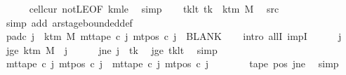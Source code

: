 \begin{isabellebody}
\ \ \ \ \isamarkupfalse%
\ cell{\isacharunderscore}{\kern0pt}cur\ notLE{\isacharbrackleft}{\kern0pt}OF\ km{}le{\isacharbrackright}{\kern0pt}\ \isamarkupfalse%
\ simp\isanewline
\ \ \isamarkupfalse%
\ tk{\isacharunderscore}{\kern0pt}lt{\isacharcolon}{\kern0pt}\ {\isachardoublequoteopen}tk\ {\isacharless}{\kern0pt}\ k{\isacharunderscore}{\kern0pt}tm\ M{\isachardoublequoteclose}\ \isamarkupfalse%
\ src{}\ \isamarkupfalse%
\ {\isacharparenleft}{\kern0pt}simp\ add{\isacharcolon}{\kern0pt}\ ar{\isacharunderscore}{\kern0pt}stage{\isacharunderscore}{\kern0pt}bounded{\isacharunderscore}{\kern0pt}def{\isacharparenright}{\kern0pt}\isanewline
\ \ \isamarkupfalse%
\ pad{\isacharunderscore}{\kern0pt}c{}{\isacharcolon}{\kern0pt}\ {\isachardoublequoteopen}{\isasymforall}j\ {\isasymge}\ k{\isacharunderscore}{\kern0pt}tm\ M{\isachardot}{\kern0pt}\ mt{\isacharunderscore}{\kern0pt}tape\ c{}\ j\ {\isacharparenleft}{\kern0pt}mt{\isacharunderscore}{\kern0pt}pos\ c{}\ j{\isacharparenright}{\kern0pt}\ {\isacharequal}{\kern0pt}\ BLANK{}{\isachardoublequoteclose}\isanewline
\ \ \isamarkupfalse%
\ {\isacharparenleft}{\kern0pt}intro\ allI\ impI{\isacharparenright}{\kern0pt}\isanewline
\ \ \ \ \isamarkupfalse%
\ j\ \isamarkupfalse%
\ jge{\isacharcolon}{\kern0pt}\ {\isachardoublequoteopen}k{\isacharunderscore}{\kern0pt}tm\ M\ {\isasymle}\ j{\isachardoublequoteclose}\isanewline
\ \ \ \ \isamarkupfalse%
\ jne{\isacharcolon}{\kern0pt}\ {\isachardoublequoteopen}j\ {\isasymnoteq}\ tk{\isachardoublequoteclose}\ \isamarkupfalse%
\ jge\ tk{\isacharunderscore}{\kern0pt}lt\ \isamarkupfalse%
\ simp\isanewline
\ \ \ \ \isamarkupfalse%
\ {\isachardoublequoteopen}mt{\isacharunderscore}{\kern0pt}tape\ c{}\ j\ {\isacharparenleft}{\kern0pt}mt{\isacharunderscore}{\kern0pt}pos\ c{}\ j{\isacharparenright}{\kern0pt}\ {\isacharequal}{\kern0pt}\ mt{\isacharunderscore}{\kern0pt}tape\ c{\isacharprime}{\kern0pt}\ j\ {\isacharparenleft}{\kern0pt}mt{\isacharunderscore}{\kern0pt}pos\ c{\isacharprime}{\kern0pt}\ j{\isacharparenright}{\kern0pt}{\isachardoublequoteclose}\isanewline
\ \ \ \ \ \ \isamarkupfalse%
\ tape{}\ pos{}\ jne\ \isamarkupfalse%
\ simp\isanewline
\ \ \ \ \isamarkupfalse%

\end{isabellebody}
